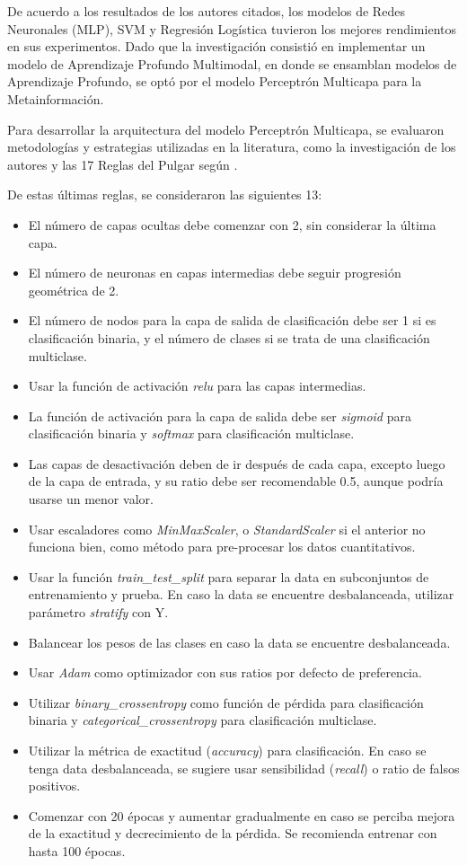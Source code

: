 De acuerdo a los resultados de los autores citados, los modelos de Redes Neuronales (MLP), SVM y Regresión Logística tuvieron los mejores rendimientos en sus experimentos. Dado que la investigación consistió en implementar un modelo de Aprendizaje Profundo Multimodal, en donde se ensamblan modelos de Aprendizaje Profundo, se optó por el modelo Perceptrón Multicapa para la Metainformación.

Para desarrollar la arquitectura del modelo Perceptrón Multicapa, se evaluaron metodologías y estrategias utilizadas en la literatura, como la investigación de los autores \cite{pr_yu2018deeplearning} y las 17 Reglas del Pulgar según \cite{tec_ranjan2019thumbrules}.

De estas últimas reglas, se consideraron las siguientes 13:
\begin{itemize}
	\item El número de capas ocultas debe comenzar con 2, sin considerar la última capa.
	\item El número de neuronas en capas intermedias debe seguir progresión geométrica de 2.
	\item El número de nodos para la capa de salida de clasificación debe ser 1 si es clasificación binaria, y el número de clases si se trata de una clasificación multiclase.
	\item Usar la función de activación \textit{relu} para las capas intermedias.
	\item La función de activación para la capa de salida debe ser \textit{sigmoid} para clasificación binaria y \textit{softmax} para clasificación multiclase.
	\item Las capas de desactivación deben de ir después de cada capa, excepto luego de la capa de entrada, y su ratio debe ser recomendable 0.5, aunque podría usarse un menor valor.
	\item Usar escaladores como \textit{MinMaxScaler}, o \textit{StandardScaler} si el anterior no funciona bien, como método para pre-procesar los datos cuantitativos.
	\item Usar la función \textit{train\_test\_split} para separar la data en subconjuntos de entrenamiento y prueba. En caso la data se encuentre desbalanceada, utilizar parámetro \textit{stratify} con Y.
	\item Balancear los pesos de las clases en caso la data se encuentre desbalanceada.
	\item Usar \textit{Adam} como optimizador con sus ratios por defecto de preferencia.
	\item Utilizar \textit{binary\_crossentropy} como función de pérdida para clasificación binaria y \textit{categorical\_crossentropy} para clasificación multiclase.
	\item Utilizar la métrica de exactitud (\textit{accuracy}) para clasificación. En caso se tenga data desbalanceada, se sugiere usar sensibilidad (\textit{recall}) o ratio de falsos positivos.
	\item Comenzar con 20 épocas y aumentar gradualmente en caso se perciba mejora de la exactitud y decrecimiento de la pérdida. Se recomienda entrenar con hasta 100 épocas.
\end{itemize}

